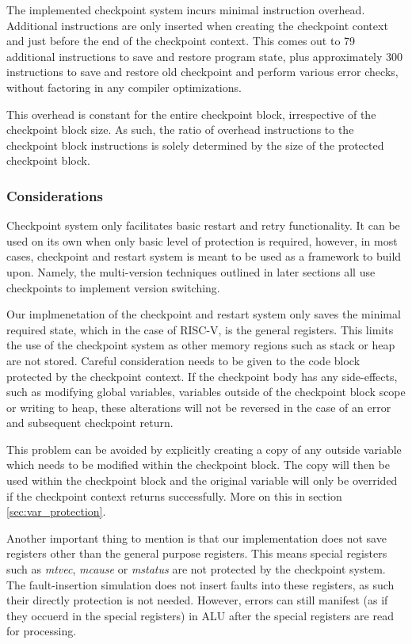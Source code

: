 \documentclass[12pt, letterpaper]{article}
\begin{document}
The implemented checkpoint system incurs minimal instruction overhead. Additional instructions are only inserted when creating the checkpoint context and just before the end of the checkpoint context. This comes out to 79 additional instructions to save and restore program state, plus approximately 300 instructions to save and restore old checkpoint and perform various error checks, without factoring in any compiler optimizations.

This overhead is constant for the entire checkpoint block, irrespective of the checkpoint block size. As such, the ratio of overhead instructions to the checkpoint block instructions is solely determined by the size of the protected checkpoint block.

\subsubsection{Considerations}

Checkpoint system only facilitates basic restart and retry functionality. It can be used on its own when only basic level of protection is required, however, in most cases, checkpoint and restart system is meant to be used as a framework to build upon. Namely, the multi-version techniques outlined in later sections all use checkpoints to implement version switching.

Our implmenetation of the checkpoint and restart system only saves the minimal required state, which in the case of RISC-V, is the general registers. This limits the use of the checkpoint system as other memory regions such as stack or heap are not stored. Careful consideration needs to be given to the code block protected by the checkpoint context. If the checkpoint body has any side-effects, such as modifying global variables, variables outside of the checkpoint block scope or writing to heap, these alterations will not be reversed in the case of an error and subsequent checkpoint return.

This problem can be avoided by explicitly creating a copy of any outside variable which needs to be modified within the checkpoint block. The copy will then be used within the checkpoint block and the original variable will only be overrided if the checkpoint context returns successfully. More on this in section \ref{sec:var_protection}.

Another important thing to mention is that our implementation does not save registers other than the general purpose registers. This means special registers such as \textit{mtvec}, \textit{mcause} or \textit{mstatus} are not protected by the checkpoint system. The fault-insertion simulation does not insert faults into these registers, as such their directly protection is not needed. However, errors can still manifest (as if they occuerd in the special registers) in ALU after the special registers are read for processing.
\end{document}
